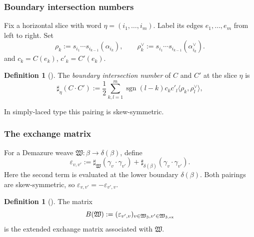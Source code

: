 \documentclass[12pt, reqno]{amsart}
\theoremstyle{plain}
\theoremstyle{definition}
\newtheorem{definition}[theorem]{Definition}
\numberwithin{equation}{section}
\begin{document}
\subsubsection{Boundary intersection numbers}

Fix a horizontal slice with word
\(\eta=(i_1,\ldots,i_m)\). Label its edges \(e_1,\ldots,e_m\)
from left to right. Set
\begin{equation}\label{eq:slice-roots-coroots}
    \rho_k:=s_{i_1}\cdots s_{i_{k-1}}(\alpha_{i_k}),
    \qquad
    \rho_k^\vee
    :=s_{i_1}\cdots s_{i_{k-1}}(\alpha_{i_k}^\vee).
\end{equation}
and \(c_k=C(e_k)\), \(c'_k=C'(e_k)\).

\begin{definition}[{\cite[Definition~4.24]{casals2025cluster}}]
    \label{def:boundary-intersection}
    The \emph{boundary intersection number} of \(C\) and \(C'\) at
    the slice \(\eta\) is
    \begin{equation}\label{eq:boundary-intersection}
        \sharp_\eta(C\mathbin{\cdot}C')
        :=\frac12\sum_{k,l=1}^m
        \operatorname{sgn}(l-k)c_kc'_l
        \bigl\langle\rho_k,\rho_l^\vee\bigr\rangle,
    \end{equation}
\end{definition}

In simply-laced type this pairing is skew-symmetric.

\subsubsection{The exchange matrix}

For a Demazure weave
\(\mathfrak W\colon\beta\to\delta(\beta)\), define
\begin{equation}\label{eq:weave-exchange-entry}
    \varepsilon_{v,v'}
    :=\sharp_{\mathfrak W}
       (\gamma_v\mathbin{\cdot}\gamma_{v'})
      +\sharp_{\delta(\beta)}
       (\gamma_v\mathbin{\cdot}\gamma_{v'}).
\end{equation}
Here the second term is evaluated at the lower boundary
\(\delta(\beta)\). Both pairings are skew-symmetric, so
\(\varepsilon_{v,v'}=-\varepsilon_{v',v}\).

\begin{definition}[{\cite[Definition~4.26]{casals2025cluster}}]
    \label{def:exchange-matrix-weave}
    The matrix
    \begin{equation}\label{eq:exchange-matrix-weave}
        B(\mathfrak W)
        :=(\varepsilon_{v',v})_{v\in\mathfrak W_3, v'\in \mathfrak W_{3,\rm ex}}
    \end{equation}
    is the extended exchange matrix associated with
    \(\mathfrak W\).
\end{definition}
\end{document}

